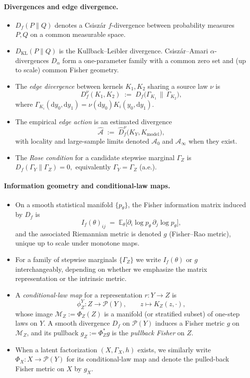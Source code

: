 \documentclass[11pt]{article}
\newcommand{\1}{\mathbf{1}}
\begin{document}
\paragraph{Divergences and edge divergence.}
\begin{itemize}[leftmargin=1.7em,itemsep=2pt,topsep=2pt]
  \item $D_f(P\|Q)$ denotes a Csiszár $f$-divergence between probability measures $P,Q$ on a common measurable space.
  \item $D_{\mathrm{KL}}(P\|Q)$ is the Kullback--Leibler divergence. Csiszár--Amari $\alpha$-divergences $D_\alpha$ form a one-parameter family with a common zero set and (up to scale) common Fisher geometry.
  \item The \emph{edge divergence} between kernels $K_1,K_2$ sharing a source law $\nu$ is
  \[
    D_f^{\nu}(K_1,K_2)
    \;:=\;
    D_f\!\bigl(\Gamma_{K_1}\,\big\|\,\Gamma_{K_2}\bigr),
  \]
  where $\Gamma_{K_i}(\mathrm{d}y_0,\mathrm{d}y_1)=\nu(\mathrm{d}y_0)K_i(y_0,\mathrm{d}y_1)$.
  \item The empirical \emph{edge action} is an estimated divergence
  \[
    \widehat{\mathcal A}
    \;:=\;
    \widehat D_f^{\nu}\!\bigl(K_Y,K_{\text{model}}\bigr),
  \]
  with locality and large-sample limits denoted $\mathcal A_0$ and $\mathcal A_\infty$ when they exist.
  \item The \emph{Rose condition} for a candidate stepwise marginal $\Gamma_Z$ is
  \(
    D_f(\Gamma_Y\|\Gamma_Z)=0,
  \)
  equivalently $\Gamma_Y=\Gamma_Z$ (a.e.).
\end{itemize}

\paragraph{Information geometry and conditional-law maps.}
\begin{itemize}[leftmargin=1.7em,itemsep=2pt,topsep=2pt]
  \item On a smooth statistical manifold $\{p_\theta\}$, the Fisher information matrix induced by $D_f$ is
  \[
    I_f(\theta)_{ij}
    \;=\;
    \mathbb{E}_\theta\big[\partial_i \log p_\theta\,\partial_j \log p_\theta\big],
  \]
  and the associated Riemannian metric is denoted $g$ (Fisher--Rao metric), unique up to scale under monotone maps.
  \item For a family of stepwise marginals $\{\Gamma_Z\}$ we write $I_f(\theta)$ or $g$ interchangeably, depending on whether we emphasize the matrix representation or the intrinsic metric.
  \item A \emph{conditional-law map} for a representation $r:Y\to Z$ is
  \[
    \phi_Z^Y: Z \to \mathcal{P}(Y),\qquad z \mapsto K_Z(z,\cdot),
  \]
  whose image $\mathcal{M}_Z := \Phi_Z(Z)$ is a manifold (or stratified subset) of one-step laws on $Y$. A smooth divergence $D_f$ on $\mathcal{P}(Y)$ induces a Fisher metric $g$ on $\mathcal{M}_Z$, and its pullback
  \(
    g_Z := \Phi_Z^\ast g
  \)
  is the \emph{pullback Fisher} on $Z$.
  \item When a latent factorization $(X,\Gamma_X,h)$ exists, we similarly write $\Phi_X:X\to\mathcal{P}(Y)$ for its conditional-law map and denote the pulled-back Fisher metric on $X$ by $g_X$.
\end{itemize}
\end{document}
